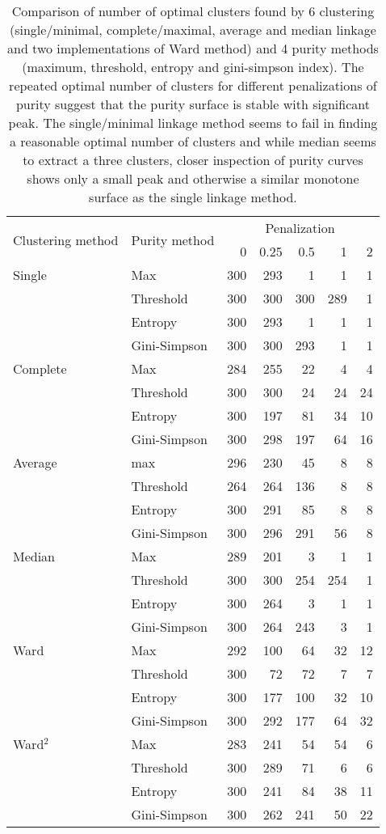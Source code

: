 \documentclass[12pt, a4paper]{article}
\begin{document}
\begin{table}
    \centering
    \begin{tabular}{llrrrrr}
    \toprule
    \multirow{2}{*}[-2pt]{Clustering method} & \multirow{2}{*}[-2pt]{Purity method} & \multicolumn{5}{c}{Penalization}\\ \cmidrule(l){3-7}
    & & 0 & 0.25 & 0.5 & 1 & 2 \\ \midrule
    Single & Max & 300 & 293 & 1 & 1 & 1\\
     & Threshold & 300 & 300 & 300 & 289 & 1\\
     & Entropy & 300 & 293 & 1 & 1 & 1\\
     & Gini-Simpson & 300 & 300 & 293 & 1 & 1\\[1em]
    Complete & Max & 284 & 255 & 22 & 4 & 4\\
     & Threshold & 300 & 300 & 24 & 24 & 24\\
     & Entropy & 300 & 197 & 81 & 34 & 10\\
     & Gini-Simpson & 300 & 298 & 197 & 64 & 16\\[1em]
    Average & max & 296 & 230 & 45 & 8 & 8\\
     & Threshold & 264 & 264 & 136 & 8 & 8\\
     & Entropy & 300 & 291 & 85 & 8 & 8\\
     & Gini-Simpson & 300 & 296 & 291 & 56 & 8\\[1em]
    Median & Max & 289 & 201 & 3 & 1 & 1\\
     & Threshold & 300 & 300 & 254 & 254 & 1\\
     & Entropy & 300 & 264 & 3 & 1 & 1\\
     & Gini-Simpson & 300 & 264 & 243 & 3 & 1\\[1em]
    Ward & Max & 292 & 100 & 64 & 32 & 12\\
     & Threshold & 300 & 72 & 72 & 7 & 7\\
     & Entropy & 300 & 177 & 100 & 32 & 10\\
     & Gini-Simpson & 300 & 292 & 177 & 64 & 32\\[1em]
    Ward$^2$ & Max & 283 & 241 & 54 & 54 & 6\\
     & Threshold & 300 & 289 & 71 & 6 & 6\\
     & Entropy & 300 & 241 & 84 & 38 & 11\\
     & Gini-Simpson & 300 & 262 & 241 & 50 & 22\\
    \bottomrule
    \end{tabular}
    \caption{Comparison of number of optimal clusters found by 6 clustering (single/minimal, complete/maximal, average and median linkage and two implementations of Ward method) and 4 purity methods (maximum, threshold, entropy and gini-simpson index). The repeated optimal number of clusters for different penalizations of purity suggest that the purity surface is stable with significant peak. The single/minimal linkage method seems to fail in finding a reasonable optimal number of clusters and while median seems to extract a three clusters, closer inspection of purity curves shows only a small peak and otherwise a similar monotone surface as the single linkage method.}
\end{table}
\end{document}

